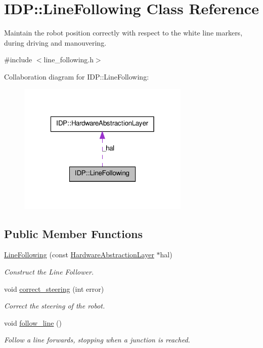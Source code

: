 \hypertarget{classIDP_1_1LineFollowing}{
\section{IDP::LineFollowing Class Reference}
\label{classIDP_1_1LineFollowing}
}


Maintain the robot position correctly with respect to the white line markers, during driving and manouvering.  




{\ttfamily \#include $<$line\_\-following.h$>$}



Collaboration diagram for IDP::LineFollowing:\nopagebreak
\begin{figure}[H]
\begin{center}
\leavevmode
\includegraphics[width=232pt]{classIDP_1_1LineFollowing__coll__graph}
\end{center}
\end{figure}
\subsection*{Public Member Functions}
\begin{DoxyCompactItemize}
\item 
\hyperlink{classIDP_1_1LineFollowing_ab30cde971719545d81ce253ae995cc4d}{LineFollowing} (const \hyperlink{classIDP_1_1HardwareAbstractionLayer}{HardwareAbstractionLayer} $\ast$hal)
\begin{DoxyCompactList}\small\item\em Construct the Line Follower. \item\end{DoxyCompactList}\item 
void \hyperlink{classIDP_1_1LineFollowing_af578916c93854c701fccbdaef783997b}{correct\_\-steering} (int error)
\begin{DoxyCompactList}\small\item\em Correct the steering of the robot. \item\end{DoxyCompactList}\item 
void \hyperlink{classIDP_1_1LineFollowing_a35c80e04729e98dfa927159610605649}{follow\_\-line} ()
\begin{DoxyCompactList}\small\item\em Follow a line forwards, stopping when a junction is reached. \item\end{DoxyCompactList}\end{DoxyCompactItemize}


